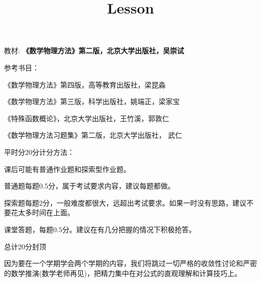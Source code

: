 \documentclass[CJK]{beamer}
\title{Lesson }
\author{}
\date{}
\begin{document}

\begin{frame}
\bch
教材:
{\bf \blue《数学物理方法》第二版，北京大学出版社，吴崇试}

\skiplines

参考书目：
\bitem
\item{《数学物理方法》第四版，高等教育出版社，梁昆淼}  
\item{《数学物理方法》第三版，科学出版社，姚端正，梁家宝}
\item{《特殊函数概论》，北京大学出版社，王竹溪，郭敦仁}
\item{《数学物理方法习题集》第二版，北京大学出版社， 武仁}
  \eitem
\ech
\end{frame}


\begin{frame}
\bch
{}

平时分20分计分方法：

\bitem
\item{课后可能有普通作业题和探索型作业题。}
\item{普通题每题$0.5$分，属于考试要求内容，建议每题都做。}
\item{探索题每题$2$分，一般难度都很大，远超出考试要求。如果一时没有思路，建议不要花太多时间在上面。}
\item{课堂答题，每题$0.5$分。建议在有几分把握的情况下积极抢答。}
\item{总计20分封顶}  
  
\eitem

\ech
\end{frame}




\begin{frame}
\bch
因为要在一个学期学会两个学期的内容，我们将跳过一切严格的收敛性讨论和严密的数学推演(数学老师再见\bye)，把精力集中在对公式的直观理解和计算技巧上。

\ech
\end{frame}
\end{document}
